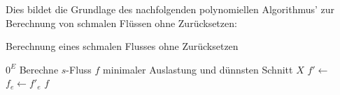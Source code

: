 Dies bildet die Grundlage des nachfolgenden polynomiellen Algorithmus' zur Berechnung von schmalen Flüssen ohne Zurücksetzen:

\begin{algorithm}
\caption{Berechnung eines schmalen Flusses ohne Zurücksetzen}
\begin{algorithmic}[1]
		\State\Return $0^E$
	\Else 
		\State Berechne $s$-Fluss $f$ minimaler Auslastung und dünnsten Schnitt $X$
		\State $f' \gets $ 
		 \State $f_e \gets f'_e$ \EndFor
		\State\Return $f$
	\EndIf
\EndFunction
\end{algorithmic}
\end{algorithm}